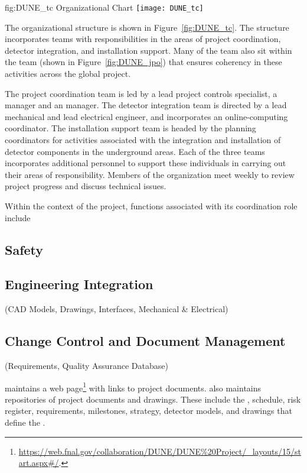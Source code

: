 \begin{dunefigure}{fig:DUNE_tc}
  {  Organizational Chart}
  \texttt{[image: DUNE\_tc]}
\end{dunefigure}

The   organizational structure is shown in 
Figure~\ref{fig:DUNE_tc}.  The structure incorporates teams with 
responsibilities in the areas of project coordination, detector integration,
and installation support.  Many of the  team also sit within 
the  team (shown in Figure~\ref{fig:DUNE_jpo}) that ensures 
coherency in these activities across the global project. 

The project coordination team is led by a lead project controls
specialist, a  manager and an  manager.  The
detector integration team is directed by a lead mechanical and lead
electrical engineer, and incorporates an online-computing coordinator.
The installation support team is headed by the planning coordinators 
for activities associated with the integration and installation of 
detector components in the underground areas.  Each of the three 
teams incorporates additional personnel to support these individuals 
in carrying out their areas of responsibility.  Members of the 
 organization meet weekly to review project progress and 
discuss %
technical issues. 
     
Within the context of the  project,  functions 
associated with its coordination role include

\subsection{Safety}

\subsection{Engineering Integration}
 (CAD Models, Drawings, Interfaces, Mechanical \& Electrical)%
 
\subsection{Change Control and Document Management}
 (Requirements, Quality Assurance Database) %
 
 maintains a web
page\footnote{\url{https://web.fnal.gov/collaboration/DUNE/DUNE\%20Project/\_layouts/15/start.aspx\#/}.}
with links to project documents.  also maintains repositories of project documents and drawings.
These include the , schedule, risk register, requirements, milestones, strategy, detector 
models, and drawings that define the  .

